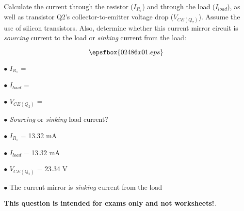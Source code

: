 

Calculate the current through the resistor ($I_{R_1}$) and through the load ($I_{load}$), as well as transistor Q2's collector-to-emitter voltage drop ($V_{CE(Q_2)}$).  Assume the use of silicon transistors.  Also, determine whether this current mirror circuit is {\it sourcing} current to the load or {\it sinking} current from the load:

$$\epsfbox{02486x01.eps}$$

\medskip
\item{$\bullet$} $I_{R_1}$ = 
\item{$\bullet$} $I_{load}$ = 
\item{$\bullet$} $V_{CE(Q_2)}$ = 
\item{$\bullet$} {\it Sourcing} or {\it sinking} load current?
\medskip







\medskip
\item{$\bullet$} $I_{R_1}$ = 13.32 mA
\item{$\bullet$} $I_{load}$ = 13.32 mA
\item{$\bullet$} $V_{CE(Q_2)}$ = 23.34 V
\item{$\bullet$} The current mirror is {\it sinking} current from the load
\medskip







{\bf This question is intended for exams only and not worksheets!}.




